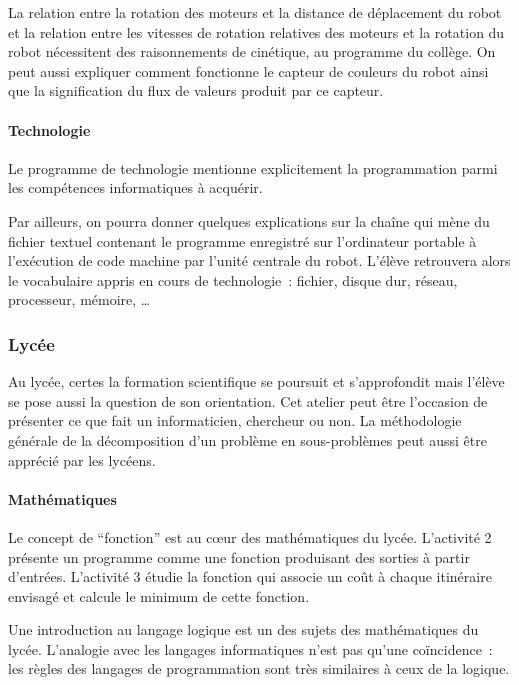 \documentclass[11pt,a4paper]{article}
\begin{document}
La relation entre la rotation des moteurs et la distance de déplacement du robot et la relation
entre les vitesses de rotation relatives des moteurs et la rotation du robot nécessitent des
raisonnements de cinétique, au programme du collège. On peut aussi expliquer comment fonctionne
le capteur de couleurs du robot ainsi que la signification du flux de valeurs produit par
ce capteur. 

\paragraph{Technologie}

Le programme de technologie mentionne explicitement la programmation
parmi les compétences informatiques à acquérir. 

Par ailleurs, on pourra donner quelques explications sur la chaîne qui
mène du fichier textuel contenant le programme enregistré sur
l'ordinateur portable à l'exécution de code machine par l'unité
centrale du robot. L'élève retrouvera alors le vocabulaire appris en
cours de technologie~: fichier, disque dur, réseau, processeur,
mémoire, \ldots


\subsubsection{Lycée}

Au lycée, certes la formation scientifique se poursuit et
s'approfondit mais l'élève se pose aussi la question de son
orientation. Cet atelier peut être l'occasion de présenter ce que fait
un informaticien, chercheur ou non. La méthodologie générale de la
décomposition d'un problème en sous-problèmes peut aussi être apprécié
par les lycéens.

\paragraph{Mathématiques}

Le concept de ``fonction'' est au c{\oe}ur des mathématiques du
lycée. L'activité 2 présente un programme comme une fonction
produisant des sorties à partir d'entrées. L'activité 3 étudie la
fonction qui associe un coût à chaque itinéraire envisagé et calcule
le minimum de cette fonction.

Une introduction au langage logique est un des sujets des
mathématiques du lycée. L'analogie avec les langages informatiques
n'est pas qu'une coïncidence~: les règles des langages de
programmation sont très similaires à ceux de la logique.
\end{document}
